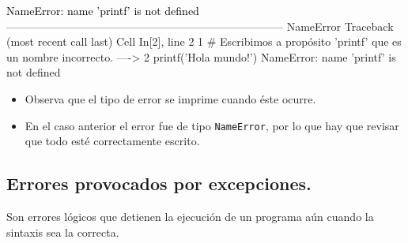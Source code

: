 \documentclass[
  spanish,
  letterpaper,
]{scrbook}
\providecommand{\tightlist}{%
  \setlength{\itemsep}{0pt}\setlength{\parskip}{0pt}}
\theoremstyle{definition}
\theoremstyle{remark}
\begin{document}
\begin{Highlighting}
\textcolor{black}{NameError: name 'printf' is not defined}
\textcolor{black}{}\textcolor{QuartoInternalColor1}{---------------------------------------------------------------------------}\textcolor{QuartoInternalColor2}{}
\textcolor{QuartoInternalColor2}{}\textcolor{QuartoInternalColor1}{NameError}\textcolor{QuartoInternalColor2}{                                 Traceback (most recent call last)}
\textcolor{QuartoInternalColor2}{}\textcolor{QuartoInternalColor3}{Cell}\textcolor{QuartoInternalColor2}{}\textcolor{QuartoInternalColor3}{ }\textcolor{QuartoInternalColor2}{}\textcolor{QuartoInternalColor4}{In[2]}\textcolor{QuartoInternalColor2}{}\textcolor{QuartoInternalColor4}{, line 2}\textcolor{QuartoInternalColor2}{}
\textcolor{QuartoInternalColor2}{}\textcolor{QuartoInternalColor4}{      1}\textcolor{QuartoInternalColor2}{ }\textcolor{QuartoInternalColor9}{# Escribimos a propósito 'printf' que es un nombre incorrecto.}\textcolor{QuartoInternalColor2}{}
\textcolor{QuartoInternalColor2}{}\textcolor{QuartoInternalColor4}{----> }\textcolor{QuartoInternalColor2}{}\textcolor{QuartoInternalColor4}{2}\textcolor{QuartoInternalColor2}{ }\textcolor{QuartoInternalColor2}{printf}\textcolor{QuartoInternalColor2}{(}\textcolor{QuartoInternalColor6}{'}\textcolor{QuartoInternalColor2}{}\textcolor{QuartoInternalColor6}{Hola mundo!}\textcolor{QuartoInternalColor2}{}\textcolor{QuartoInternalColor6}{'}\textcolor{QuartoInternalColor2}{)}
\textcolor{QuartoInternalColor2}{}\textcolor{QuartoInternalColor1}{NameError}\textcolor{QuartoInternalColor2}{: name 'printf' is not defined}
\end{Highlighting}

\begin{itemize}
\tightlist
\item
  Observa que el tipo de error se imprime cuando éste ocurre.
\item
  En el caso anterior el error fue de tipo \texttt{NameError}, por lo
  que hay que revisar que todo esté correctamente escrito.
\end{itemize}

\subsection{Errores provocados por
excepciones.}\label{errores-provocados-por-excepciones.}

Son errores lógicos que detienen la ejecución de un programa aún cuando
la sintaxis sea la correcta.
\end{document}
